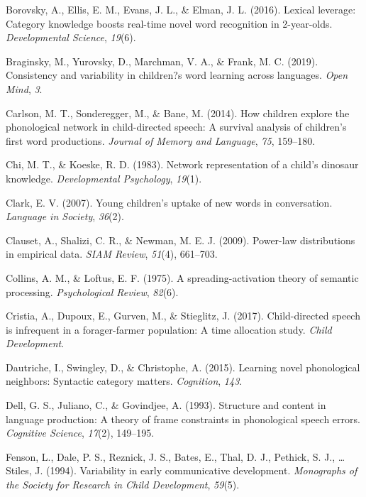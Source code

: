 \documentclass[english,floatsintext,man]{apa6}
\theoremstyle{definition}
\theoremstyle{definition}
\theoremstyle{definition}
\theoremstyle{remark}
\begin{document}
\hypertarget{ref-borovsky2016}{}
Borovsky, A., Ellis, E. M., Evans, J. L., \& Elman, J. L. (2016).
Lexical leverage: Category knowledge boosts real-time novel word
recognition in 2-year-olds. \emph{Developmental Science}, \emph{19}(6).

\hypertarget{ref-braginsky2019}{}
Braginsky, M., Yurovsky, D., Marchman, V. A., \& Frank, M. C. (2019).
Consistency and variability in children?s word learning across
languages. \emph{Open Mind}, \emph{3}.

\hypertarget{ref-carlson2014}{}
Carlson, M. T., Sonderegger, M., \& Bane, M. (2014). How children
explore the phonological network in child-directed speech: A survival
analysis of children's first word productions. \emph{Journal of Memory
and Language}, \emph{75}, 159--180.

\hypertarget{ref-chi1983}{}
Chi, M. T., \& Koeske, R. D. (1983). Network representation of a child's
dinosaur knowledge. \emph{Developmental Psychology}, \emph{19}(1).

\hypertarget{ref-clark2007}{}
Clark, E. V. (2007). Young children's uptake of new words in
conversation. \emph{Language in Society}, \emph{36}(2).

\hypertarget{ref-clauset09}{}
Clauset, A., Shalizi, C. R., \& Newman, M. E. J. (2009). Power-law
distributions in empirical data. \emph{SIAM Review}, \emph{51}(4),
661--703.

\hypertarget{ref-collins1975}{}
Collins, A. M., \& Loftus, E. F. (1975). A spreading-activation theory
of semantic processing. \emph{Psychological Review}, \emph{82}(6).

\hypertarget{ref-cristia2017}{}
Cristia, A., Dupoux, E., Gurven, M., \& Stieglitz, J. (2017).
Child-directed speech is infrequent in a forager-farmer population: A
time allocation study. \emph{Child Development}.

\hypertarget{ref-dautriche2015}{}
Dautriche, I., Swingley, D., \& Christophe, A. (2015). Learning novel
phonological neighbors: Syntactic category matters. \emph{Cognition},
\emph{143}.

\hypertarget{ref-dell1993}{}
Dell, G. S., Juliano, C., \& Govindjee, A. (1993). Structure and content
in language production: A theory of frame constraints in phonological
speech errors. \emph{Cognitive Science}, \emph{17}(2), 149--195.

\hypertarget{ref-fenson94}{}
Fenson, L., Dale, P. S., Reznick, J. S., Bates, E., Thal, D. J.,
Pethick, S. J., \ldots{} Stiles, J. (1994). Variability in early
communicative development. \emph{Monographs of the Society for Research
in Child Development}, \emph{59}(5).
\end{document}
